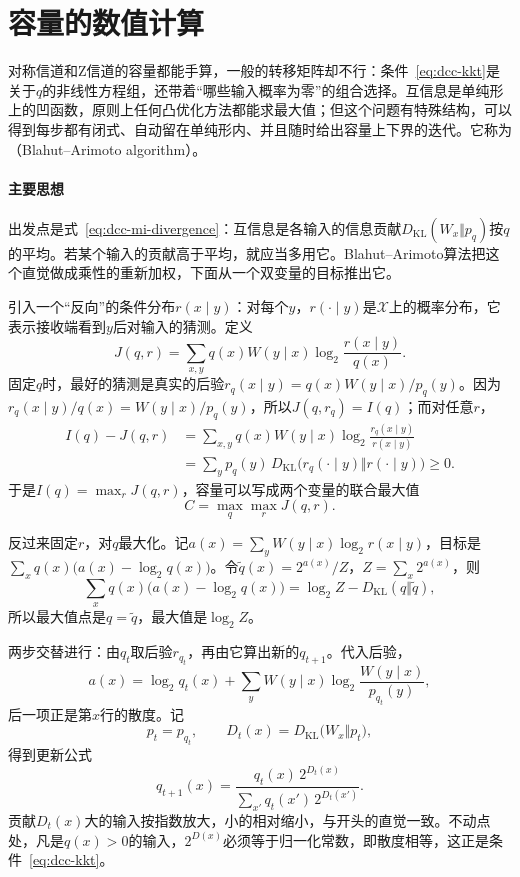 \section{容量的数值计算}
\label{sec:dcc-numerical}

对称信道和Z信道的容量都能手算，一般的转移矩阵却不行：条件~\eqref{eq:dcc-kkt}是关于$q$的非线性方程组，还带着“哪些输入概率为零”的组合选择。互信息是单纯形上的凹函数，原则上任何凸优化方法都能求最大值；但这个问题有特殊结构，可以得到每步都有闭式、自动留在单纯形内、并且随时给出容量上下界的迭代。它称为（Blahut–Arimoto algorithm）。

\paragraph{主要思想}
出发点是式~\eqref{eq:dcc-mi-divergence}：互信息是各输入的信息贡献$D_{\mathrm{KL}}(W_x\Vert p_q)$按$q$的平均。若某个输入的贡献高于平均，就应当多用它。Blahut–Arimoto算法把这个直觉做成乘性的重新加权，下面从一个双变量的目标推出它。

引入一个“反向”的条件分布$r(x\mid y)$：对每个$y$，$r(\cdot\mid y)$是$\mathcal{X}$上的概率分布，它表示接收端看到$y$后对输入的猜测。定义
\[
 J(q,r)=\sum_{x,y}q(x)W(y\mid x)\log_2\frac{r(x\mid y)}{q(x)} .
\]
固定$q$时，最好的猜测是真实的后验$r_q(x\mid y)=q(x)W(y\mid x)/p_q(y)$。因为$r_q(x\mid y)/q(x)=W(y\mid x)/p_q(y)$，所以$J(q,r_q)=I(q)$；而对任意$r$，
\[
 \begin{aligned}
 I(q)-J(q,r)&=\sum_{x,y}q(x)W(y\mid x)\log_2\frac{r_q(x\mid y)}{r(x\mid y)}\\
 &=\sum_yp_q(y)\,D_{\mathrm{KL}}\bigl(r_q(\cdot\mid y)\Vert r(\cdot\mid y)\bigr)\geq0 .
 \end{aligned}
\]
于是$I(q)=\max_rJ(q,r)$，容量可以写成两个变量的联合最大值
\begin{equation}
 C=\max_{q}\max_{r}J(q,r) .
 \label{eq:dcc-ba-double-max}
\end{equation}

反过来固定$r$，对$q$最大化。记$a(x)=\sum_yW(y\mid x)\log_2r(x\mid y)$，目标是$\sum_xq(x)\bigl(a(x)-\log_2q(x)\bigr)$。令$\tilde{q}(x)=2^{a(x)}/Z$，$Z=\sum_x2^{a(x)}$，则
\[
 \sum_xq(x)\bigl(a(x)-\log_2q(x)\bigr)=\log_2Z-D_{\mathrm{KL}}(q\Vert\tilde{q}) ,
\]
所以最大值点是$q=\tilde{q}$，最大值是$\log_2Z$。

两步交替进行：由$q_t$取后验$r_{q_t}$，再由它算出新的$q_{t+1}$。代入后验，
\[
 a(x)=\log_2q_t(x)+\sum_{y}W(y\mid x)\log_2\frac{W(y\mid x)}{p_{q_t}(y)} ,
\]
后一项正是第$x$行的散度。记
\[
 p_t=p_{q_t},\qquad D_t(x)=D_{\mathrm{KL}}\bigl(W_x\Vert p_t\bigr) ,
\]
得到更新公式
\begin{equation}
 q_{t+1}(x)=\frac{q_t(x)\,2^{D_t(x)}}{\sum_{x'}q_t(x')\,2^{D_t(x')}} .
 \label{eq:dcc-ba-update}
\end{equation}
贡献$D_t(x)$大的输入按指数放大，小的相对缩小，与开头的直觉一致。不动点处，凡是$q(x)>0$的输入，$2^{D(x)}$必须等于归一化常数，即散度相等，这正是条件~\eqref{eq:dcc-kkt}。

